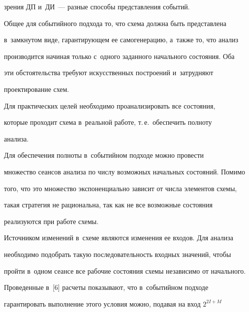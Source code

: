 зрения ДП и~ДИ~--- разные способы представления событий.


   


   Общее для событийного подхода то, что схема должна быть представлена 


в~замкнутом виде, гарантирующем ее самогенерацию, а~также то, что анализ 


производится начиная только с~одного заданного начального состояния. Оба 


эти обстоятельства требуют искусственных построений и~затрудняют 


проектирование схем.


   


   Для практических целей необходимо проанализировать все состояния, 


которые проходит схема в~реальной работе, т.\,е.\ обеспечить полноту 


анализа.


   


   Для обеспечения полноты в~событийном подходе можно провести 


множество сеансов анализа по числу возможных начальных состояний. Помимо 


того, что это множество экспоненциально зависит от числа элементов схемы, 


такая стратегия не рациональна, так как не все возможные состояния 


реализуются при работе схемы.


   


   Источником изменений в~схеме являются изменения ее входов. Для анализа 


необходимо подобрать такую последовательность входных значений, чтобы 


пройти в~одном сеансе все рабочие состояния схемы независимо от на\-чаль\-ного.


{ %





}


   


   Проведенные в~[6] расчеты показывают, что в~событийном подходе 


гарантировать выполнение этого условия можно, подавая на вход $2^{2I+M}$ 


